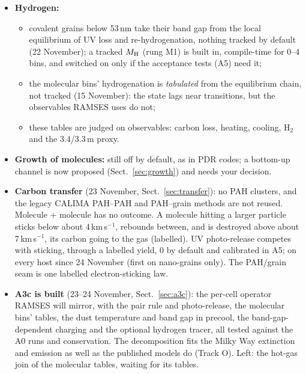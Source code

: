 \documentclass[11pt,a4paper]{article}
\newcommand{\MH}{M_{\rm H}}
\begin{document}
\begin{itemize}
\item \textbf{Hydrogen:}
  \begin{itemize}
  \item covalent grains below 53\,nm take their band gap from the local equilibrium of UV loss and
    re-hydrogenation, nothing tracked by default (22 November); a tracked $\MH$ (rung M1) is built in, compile-time
    for 0--4 bins, and switched on only if the acceptance tests (A5) need it;
  \item the molecular bins' hydrogenation is \emph{tabulated} from the equilibrium chain, not tracked (15 November):
    the state lags near transitions, but the observables RAMSES uses do not;
  \item these tables are judged on observables: carbon loss, heating, cooling, H$_2$ and the 3.4/3.3\,\textmu m proxy.
  \end{itemize}
\item \textbf{Growth of molecules:} still off by default, as in PDR codes; a bottom-up channel is now proposed
  (Sect.~\ref{sec:growth}) and needs your decision.
\item \textbf{Carbon transfer} (23 November, Sect.~\ref{sec:transfer}): no PAH clusters, and the legacy CALIMA
  PAH--PAH and PAH--grain methods are not reused. Molecule + molecule has no outcome. A molecule hitting a larger
  particle sticks below about 4\,km\,s$^{-1}$, rebounds between, and is destroyed above about 7\,km\,s$^{-1}$, its
  carbon going to the gas (labelled). UV photo-release competes with sticking, through a labelled yield, 0 by default
  and calibrated in A5; on every host since 24 November (first on nano-grains only). The PAH/grain seam is one labelled
  electron-sticking law.
\item \textbf{A3c is built} (23--24 November, Sect.~\ref{sec:a3c}): the per-cell operator RAMSES will mirror, with the
  pair rule and photo-release, the molecular bins' tables, the dust temperature and band gap in precool, the
  band-gap-dependent charging and the optional hydrogen tracer, all tested against the A0 runs and conservation. The
  decomposition fits the Milky Way extinction and emission as well as the published models do (Track O). Left: the
  hot-gas join of the molecular tables, waiting for its tables.
\end{itemize}
\end{document}
